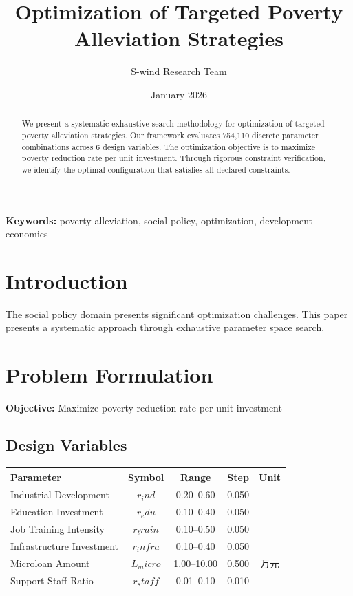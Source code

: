 \documentclass[11pt,a4paper]{article}
\title{Optimization of Targeted Poverty Alleviation Strategies}
\author{S-wind Research Team}
\date{January 2026}
\begin{document}
\maketitle

\begin{abstract}
We present a systematic exhaustive search methodology for optimization of targeted poverty alleviation strategies. Our framework evaluates 754,110 discrete parameter combinations across 6 design variables. The optimization objective is to maximize poverty reduction rate per unit investment. Through rigorous constraint verification, we identify the optimal configuration that satisfies all declared constraints.
\end{abstract}

\textbf{Keywords:} poverty alleviation, social policy, optimization, development economics

\section{Introduction}

The social policy domain presents significant optimization challenges. This paper presents a systematic approach through exhaustive parameter space search.

\section{Problem Formulation}

\textbf{Objective:} Maximize poverty reduction rate per unit investment

\subsection{Design Variables}

\begin{center}
\begin{tabular}{|l|c|c|c|c|}
\hline
Parameter & Symbol & Range & Step & Unit \\
\hline
Industrial Development & $r_ind$ & 0.20--0.60 & 0.050 &  \\
Education Investment & $r_edu$ & 0.10--0.40 & 0.050 &  \\
Job Training Intensity & $r_train$ & 0.10--0.50 & 0.050 &  \\
Infrastructure Investment & $r_infra$ & 0.10--0.40 & 0.050 &  \\
Microloan Amount & $L_micro$ & 1.00--10.00 & 0.500 & 万元 \\
Support Staff Ratio & $r_staff$ & 0.01--0.10 & 0.010 &  \\
\hline
\end{tabular}
\end{center}
\end{document}
